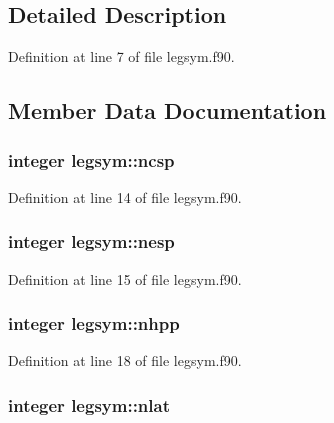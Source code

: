 \subsection{\-Detailed \-Description}


\-Definition at line 7 of file legsym.\-f90.



\subsection{\-Member \-Data \-Documentation}
\hypertarget{classlegsym_a1cc07c984867c3dc3b122ac8fce446e2}{
\subsubsection[{ncsp}]{\setlength{\rightskip}{0pt plus 5cm}integer {\bf legsym\-::ncsp}}}
\label{classlegsym_a1cc07c984867c3dc3b122ac8fce446e2}


\-Definition at line 14 of file legsym.\-f90.

\hypertarget{classlegsym_a8d1597f9974455b1abb4b57e34a77625}{
\subsubsection[{nesp}]{\setlength{\rightskip}{0pt plus 5cm}integer {\bf legsym\-::nesp}}}
\label{classlegsym_a8d1597f9974455b1abb4b57e34a77625}


\-Definition at line 15 of file legsym.\-f90.

\hypertarget{classlegsym_a2ca038107ed480d5443db9a2f0322ce1}{
\subsubsection[{nhpp}]{\setlength{\rightskip}{0pt plus 5cm}integer {\bf legsym\-::nhpp}}}
\label{classlegsym_a2ca038107ed480d5443db9a2f0322ce1}


\-Definition at line 18 of file legsym.\-f90.

\hypertarget{classlegsym_a48c28c34fad8572472b4994bf99da184}{
\subsubsection[{nlat}]{\setlength{\rightskip}{0pt plus 5cm}integer {\bf legsym\-::nlat}}}
\label{classlegsym_a48c28c34fad8572472b4994bf99da184}


